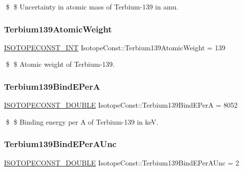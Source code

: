 \$ \$ Uncertainty in atomic mass of Terbium-\/139 in amu. \mbox{\label{group___isotope_const-_terbium-_tb139_gabf853bbc95574866bad9fc07b31583da}} 
\subsubsection{\texorpdfstring{Terbium139\+Atomic\+Weight}{Terbium139AtomicWeight}}
{\footnotesize\ttfamily \mbox{\hyperlink{group___isotope_const-_macros_ga5f18360b3e99483a35c32d789e62621c}{I\+S\+O\+T\+O\+P\+E\+C\+O\+N\+S\+T\+\_\+\+I\+NT}} Isotope\+Const\+::\+Terbium139\+Atomic\+Weight = 139}

\$ \$ Atomic weight of Terbium-\/139. \mbox{\label{group___isotope_const-_terbium-_tb139_ga98c44dd850b7911a07c63a1a1fb71047}} 
\subsubsection{\texorpdfstring{Terbium139\+Bind\+E\+PerA}{Terbium139BindEPerA}}
{\footnotesize\ttfamily \mbox{\hyperlink{group___isotope_const-_macros_ga8f45a7272ce02c0b4c65c44636ed719a}{I\+S\+O\+T\+O\+P\+E\+C\+O\+N\+S\+T\+\_\+\+D\+O\+U\+B\+LE}} Isotope\+Const\+::\+Terbium139\+Bind\+E\+PerA = 8052}

\$ \$ Binding energy per A of Terbium-\/139 in keV. \mbox{\label{group___isotope_const-_terbium-_tb139_ga64d32c880c22b0198091831e88ade606}} 
\subsubsection{\texorpdfstring{Terbium139\+Bind\+E\+Per\+A\+Unc}{Terbium139BindEPerAUnc}}
{\footnotesize\ttfamily \mbox{\hyperlink{group___isotope_const-_macros_ga8f45a7272ce02c0b4c65c44636ed719a}{I\+S\+O\+T\+O\+P\+E\+C\+O\+N\+S\+T\+\_\+\+D\+O\+U\+B\+LE}} Isotope\+Const\+::\+Terbium139\+Bind\+E\+Per\+A\+Unc = 2}

